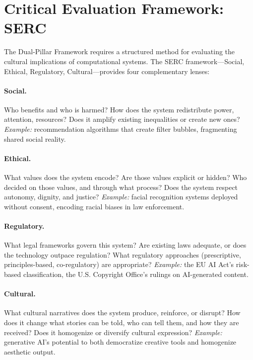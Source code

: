 \documentclass[11pt,a4paper]{article}
\begin{document}
\section{Critical Evaluation Framework: SERC}

The Dual-Pillar Framework requires a structured method for evaluating the cultural implications of computational systems. The SERC framework---Social, Ethical, Regulatory, Cultural---provides four complementary lenses:

\paragraph{Social.}
Who benefits and who is harmed? How does the system redistribute power, attention, resources? Does it amplify existing inequalities or create new ones? \emph{Example:} recommendation algorithms that create filter bubbles, fragmenting shared social reality.

\paragraph{Ethical.}
What values does the system encode? Are those values explicit or hidden? Who decided on those values, and through what process? Does the system respect autonomy, dignity, and justice? \emph{Example:} facial recognition systems deployed without consent, encoding racial biases in law enforcement.

\paragraph{Regulatory.}
What legal frameworks govern this system? Are existing laws adequate, or does the technology outpace regulation? What regulatory approaches (prescriptive, principles-based, co-regulatory) are appropriate? \emph{Example:} the EU AI Act's risk-based classification, the U.S. Copyright Office's rulings on AI-generated content.

\paragraph{Cultural.}
What cultural narratives does the system produce, reinforce, or disrupt? How does it change what stories can be told, who can tell them, and how they are received? Does it homogenize or diversify cultural expression? \emph{Example:} generative AI's potential to both democratize creative tools and homogenize aesthetic output.
\end{document}
